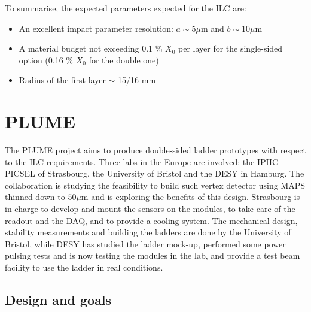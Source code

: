    To summarise, the expected parameters expected for the \gls{ILC} are: 
   \begin{itemize}
     \item An excellent impact parameter resolution: $ a \sim 5 \mu\text{m}$ and $b \sim 10 \mu\text{m}$
     \item A material budget not exceeding 0.1 \% $X_0$ per layer for the single-sided option (0.16 \% $X_0$ for the double one)
     \item Radius of the first layer $\sim$ 15/16 mm
   \end{itemize}

  \section{PLUME}

  The \acrfull{PLUME} project aims to produce double-sided ladder prototypes with respect to the \gls{ILC} requirements.
  Three labs in the Europe are involved: the IPHC-PICSEL of Strasbourg, the University of Bristol and the DESY in Hamburg.
  The collaboration is studying the feasibility to build such vertex detector using \gls{MAPS} thinned down to $50 \mu\text{m}$ and is exploring the benefits of this design.
  Strasbourg is in charge to develop and mount the sensors on the modules, to take care of the readout and the \gls{DAQ}, and to provide a cooling system.
  The mechanical design, stability measurements and building the ladders are done by the University of Bristol, while DESY has studied the ladder mock-up, performed some power pulsing tests and is now testing the modules in the lab, and provide a test beam facility to use the ladder in real conditions.

    \subsection{Design and goals}

